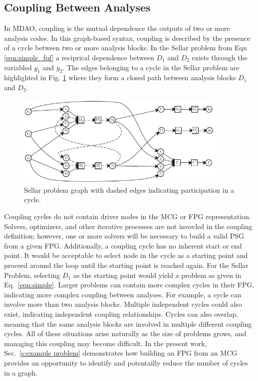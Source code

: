 \subsection{Coupling Between Analyses}
  In MDAO, coupling is the mutual dependence the outputs of two or more analysis 
  codes. In this graph-based syntax, coupling is described by the presence of a 
  cycle between two or more analysis blocks. In the Sellar problem from Eqn \ref{eqn:simple_fpf} 
  a reciprical dependence between $D_1$ and $D_2$ exists through the variabled $y_1$ and $y_2$. 
  The edges belonging to a cycle in the Sellar problem are highlighted in 
  Fig. \ref{f:sellar cycles} where they form a closed path between analysis blocks $D_1$ and $D_2$.

 \begin{figure}[htb!]
  \begin{center}
    \includegraphics[width=4.0in]{images/sellar_cycles}
  \end{center}
    \caption{Sellar problem graph with dashed edges indicating participation in a cycle.
\label{f:sellar cycles}
    }
\end{figure} 

  Coupling cycles do not contain driver nodes in the MCG or FPG representation. 
  Solvers, optimizers, and other iterative processes are not invovled in the coupling 
  definition; however, one or more solvers will be necessary to build a valid PSG from a given FPG. 
  Additionally, a coupling cycle has no inherent start or end point. It would be acceptable to select
  node in the cycle as a starting point and proceed around the
  loop until the starting point is reached again. For the Sellar Problem, selecting 
  $D_1$ as the starting point would yield a problem as given in 
  Eq.~\ref{eqn:simple}.
  Larger problems can contain more complex cycles in their FPG, indicating more 
  complex coupling between analyses. For example, a cycle can involve more than 
   two analysis blocks. Multiple independent cycles could also exist, indicating 
  independent coupling relationships. Cycles can also overlap, meaning that the same analysis 
  blocks are involved in multiple different coupling cycles. All of these situations
  arise naturally as the size of problems grows, and managing this coupling may
  become difficult. In the present work, Sec.~\ref{s:example problem}
  demonstrates how building an FPG from an MCG provides an opportunity to 
  identify and potentailly reduce the number of cycles in a graph. 

